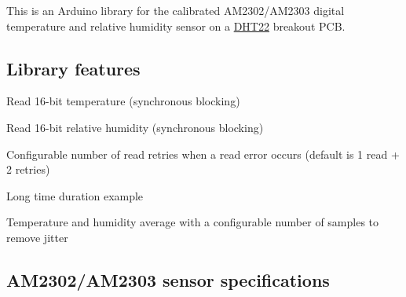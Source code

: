 \href{https://travis-ci.org/Erriez/ErriezDHT22}{\tt }

This is an Arduino library for the calibrated A\+M2302/\+A\+M2303 digital temperature and relative humidity sensor on a \hyperlink{class_d_h_t22}{D\+H\+T22} breakout P\+CB.



\subsection*{Library features}


\begin{DoxyItemize}
\item Read 16-\/bit temperature (synchronous blocking)
\item Read 16-\/bit relative humidity (synchronous blocking)
\item Configurable number of read retries when a read error occurs (default is 1 read + 2 retries)
\item Long time duration example
\item Temperature and humidity average with a configurable number of samples to remove jitter
\end{DoxyItemize}

\subsection*{A\+M2302/\+A\+M2303 sensor specifications}


